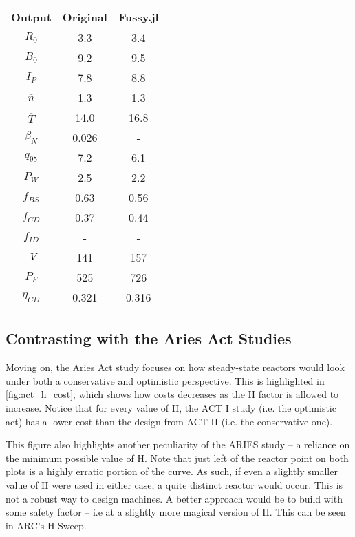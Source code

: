 \begin{table}[h!]
\begin{subtable}[t]{0.5\textwidth}
\begin{tabular}{ c|c|c }
Output           & Original         & Fussy.jl        \\
\hline
$R_{0}$          & 3.3              & 3.4           \\
$B_{0}$          & 9.2              & 9.5           \\
$I_{P}$          & 7.8              & 8.8           \\
$\overline n$    & 1.3              & 1.3           \\
$\overline T$    & 14.0             & 16.8           \\
$\beta_{N}$       & 0.026           & -          \\
$q_{95}$         & 7.2              & 6.1           \\
$P_{W}$          & 2.5              & 2.2           \\
$f_{BS}$         & 0.63             & 0.56          \\
$f_{CD}$         & 0.37             & 0.44          \\
$f_{ID}$         & -              & -             \\
$\volume$         & 141            & 157           \\
$P_{F}$          & 525            & 726           \\
$\eta_{CD}$      & 0.321            & 0.316          \\

\end{tabular}
\end{subtable}
\hfill
\hfill
\end{table}

\newpage

\subsection{Contrasting with the Aries Act Studies}

Moving on, the Aries Act study focuses on how steady-state reactors would look under both a conservative and optimistic perspective. This is highlighted in \cref{fig:act_h_cost}, which shows how costs decreases as the H factor is allowed to increase. Notice that for every value of H, the ACT I study (i.e. the optimistic act) has a lower cost than the design from ACT II (i.e. the conservative one).

This figure also highlights another peculiarity of the ARIES study -- a reliance on the minimum possible value of H. Note that just left of the reactor point on both plots is a highly erratic portion of the curve. As such, if even a slightly smaller value of H were used in either case, a quite distinct reactor would occur. This is not a robust way to design machines. A better approach would be to build with some safety factor -- i.e at a slightly more magical version of H. This can be seen in ARC's H-Sweep.

